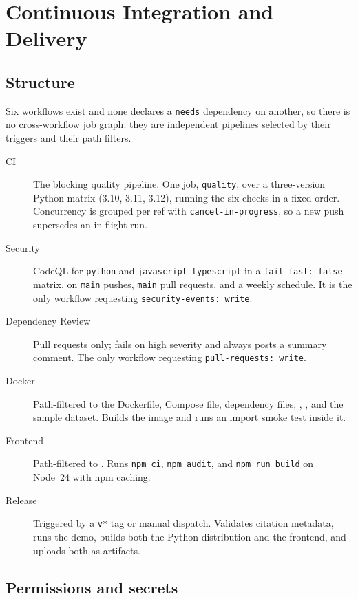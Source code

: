 
\chapter{Continuous Integration and Delivery}
\label{ch:ci-cd}

\section{Structure}

Six workflows exist and none declares a \texttt{needs} dependency on another,
so there is no cross-workflow job graph: they are independent pipelines
selected by their triggers and their path filters.

\begin{description}
  \item[CI] The blocking quality pipeline. One job, \texttt{quality}, over a
    three-version Python matrix (3.10, 3.11, 3.12), running the six checks in
    a fixed order. Concurrency is grouped per ref with
    \texttt{cancel-in-progress}, so a new push supersedes an in-flight run.
  \item[Security] CodeQL for \texttt{python} and
    \texttt{javascript-typescript} in a \texttt{fail-fast: false} matrix, on
    \texttt{main} pushes, \texttt{main} pull requests, and a weekly schedule.
    It is the only workflow requesting \texttt{security-events: write}.
  \item[Dependency Review] Pull requests only; fails on high severity and
    always posts a summary comment. The only workflow requesting
    \texttt{pull-requests: write}.
  \item[Docker] Path-filtered to the Dockerfile, Compose file, dependency
    files, , , and the sample dataset. Builds
    the image and runs an import smoke test inside it.
  \item[Frontend] Path-filtered to . Runs \texttt{npm ci},
    \texttt{npm audit}, and \texttt{npm run build} on Node~24 with npm caching.
  \item[Release] Triggered by a \texttt{v*} tag or manual dispatch. Validates
    citation metadata, runs the demo, builds both the Python distribution and
    the frontend, and uploads both as artifacts.
\end{description}

\section{Permissions and secrets}

